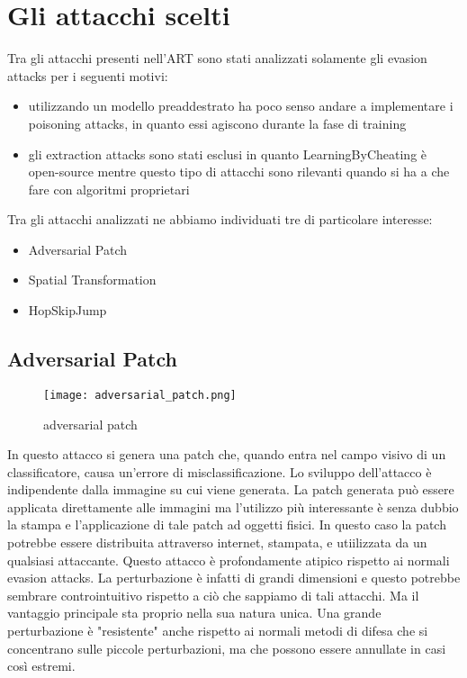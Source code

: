 \section{Gli attacchi scelti}
Tra gli attacchi presenti nell'ART sono stati analizzati solamente gli evasion attacks per i seguenti motivi:\begin{itemize}
    \item utilizzando un modello preaddestrato ha poco senso andare a implementare i poisoning attacks, in quanto essi agiscono durante la fase di training
    \item gli extraction attacks sono stati esclusi in quanto LearningByCheating è open-source mentre questo tipo di attacchi sono rilevanti quando si ha a che fare
    con algoritmi proprietari
\end{itemize}
Tra gli attacchi analizzati ne abbiamo individuati tre di particolare interesse:\begin{itemize}
    \item Adversarial Patch
    \item Spatial Transformation
    \item HopSkipJump
\end{itemize}
\subsection{Adversarial Patch} 
\begin{figure}[h]
    \texttt{[image: adversarial\_patch.png]}
    \caption{adversarial patch}
    \label{fig:patch}
\end{figure}
\cite{patch} In questo attacco si genera una patch che, quando entra nel campo visivo di un classificatore, causa un'errore di misclassificazione. Lo sviluppo dell'attacco è 
indipendente dalla immagine su cui viene generata. La patch generata può essere applicata direttamente alle immagini ma l'utilizzo più interessante è senza dubbio la stampa e l'applicazione di tale patch
ad oggetti fisici. In questo caso la patch potrebbe essere distribuita attraverso internet, stampata, e utiilizzata da un qualsiasi attaccante. Questo attacco è profondamente atipico rispetto
ai normali evasion attacks. La perturbazione è infatti di grandi dimensioni e questo potrebbe sembrare controintuitivo rispetto a ciò che sappiamo di tali attacchi. Ma il vantaggio principale
sta proprio nella sua natura unica. Una grande perturbazione è "resistente" anche rispetto ai normali metodi di difesa che si concentrano sulle piccole perturbazioni, ma che possono essere annullate in 
casi così estremi.
